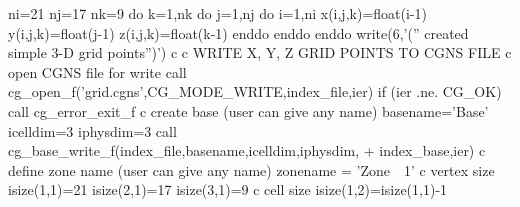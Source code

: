 \documentclass[12pt]{article}
\begin{document}
{\newline\indent      ni=21
\newline\indent      nj=17
\newline\indent      nk=9
\newline\indent      do k=1,nk
\newline\indent\indent        do j=1,nj
\newline\indent\indent\indent          do i=1,ni
\newline\indent\indent\indent\indent            x(i,j,k)=float(i-1)
\newline\indent\indent\indent\indent            y(i,j,k)=float(j-1)
\newline\indent\indent\indent\indent            z(i,j,k)=float(k-1)
\newline\indent\indent\indent          enddo
\newline\indent\indent        enddo
\newline\indent      enddo
\newline\indent      write(6,'('' created simple 3-D grid points'')')
\newline c
\newline c  WRITE X, Y, Z GRID POINTS TO CGNS FILE
\newline c  open CGNS file for write
\newline\indent      call cg\_open\_f('grid.cgns',CG\_MODE\_WRITE,index\_file,ier)
\newline\indent      if (ier .ne. CG\_OK) call cg\_error\_exit\_f
\newline c  create base (user can give any name)
\newline\indent      basename='Base'
\newline\indent      icelldim=3
\newline\indent      iphysdim=3
\newline\indent      call cg\_base\_write\_f(index\_file,basename,icelldim,iphysdim,
\newline + \indent index\_base,ier)
\newline c  define zone name (user can give any name)
\newline\indent      zonename = 'Zone~~1'
\newline c  vertex size
\newline\indent      isize(1,1)=21
\newline\indent      isize(2,1)=17
\newline\indent      isize(3,1)=9
\newline c  cell size
\newline\indent      isize(1,2)=isize(1,1)-1
}
\end{document}
